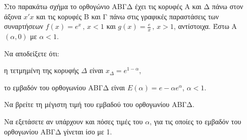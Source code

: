 \begin{figure}
\end{figure}
Στο παρακάτω σχήμα το ορθογώνιο ΑΒΓΔ έχει τις κορυφές Α και Δ πάνω στον άξονα $x'x$ και τις κορυφές Β και Γ πάνω στις γραφικές παραστάσεις των συναρτήσεων $f(x) = e^x \, , \, x < 1$ και $g(x) = \frac{e}{x} \, , \, x > 1$, αντίστοιχα. Έστω A$(\alpha, 0)$ με $\alpha < 1$.

\begin{alist}
\item Να αποδείξετε ότι:
    \begin{rlist}
    \item η τετμημένη της κορυφής $\Delta$ είναι $x_\Delta = e^{1-\alpha}$, 
    \item το εμβαδόν του ορθογωνίου ΑΒΓΔ είναι $E(\alpha) = e - \alpha e^\alpha$, $\alpha < 1$. 
    \end{rlist}
\item Να βρείτε τη μέγιστη τιμή του εμβαδού του ορθογωνίου ΑΒΓΔ. 
\item Να εξετάσετε αν υπάρχουν και πόσες τιμές του $\alpha$, για τις οποίες το εμβαδόν του ορθογωνίου ΑΒΓΔ γίνεται ίσο με 1. 
\end{alist}